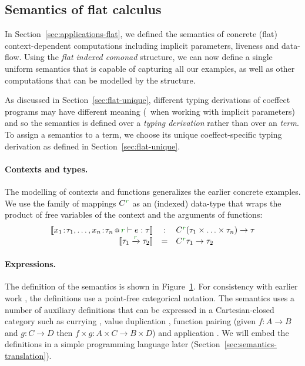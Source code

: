 \begin{figure*}[t]
\label{fig:semantics-flat}
\end{figure*}


\subsection{Semantics of flat calculus}
\label{sec:semantics-flat-calculus}

In Section~\ref{sec:applications-flat}, we defined the semantics of concrete (flat) context-dependent
computations including implicit parameters, liveness and data-flow. Using the \emph{flat indexed 
comonad} structure, we can now define a single uniform semantics that is capable of capturing all 
our examples, as well as other computations that can be modelled by the structure.

As discussed in Section~\ref{sec:flat-unique}, different typing derivations of coeffect programs 
may have different meaning (\eg~when working with implicit parameters) and so the semantics is
defined over a \emph{typing derivation} rather than over an \emph{term}. To assign a 
semantics to a term, we choose its unique coeffect-specific typing derivation as defined in 
Section~\ref{sec:flat-unique}.

\paragraph{Contexts and types.}
The modelling of contexts and functions generalizes the earlier concrete examples. We use the 
family of mappings $\ctyp{\cclrd{r}}{}$ as an (indexed) data-type that wraps the product of 
free variables of the context and the arguments of functions:
%
\begin{equation*}
\begin{array}{rcl}
\sem{\coctx{x_1\!:\!\tau_1, \ldots, x_n\!:\!\tau_n}{ \cclrd{r} } \vdash e : \tau} 
  &:& \ctyp{\cclrd{r}}{(\tau_1 \times \ldots \times \tau_n)} \rightarrow \tau\\
\sem{\tau_1 \xrightarrow{\cclrd{r}} \tau_2} &=& \ctyp{\cclrd{r}}{\tau_1} \rightarrow \tau_2
\end{array}
\end{equation*}

\paragraph{Expressions.}
The definition of the semantics is shown in Figure~\ref{fig:semantics-flat}. For consistency
with earlier work \cite{comonads-notions,comonads-dom-thesis}, the definitions use a point-free 
categorical notation. The semantics uses a number of auxiliary definitions that can be expressed
in a Cartesian-closed category such as currying , value duplication ,
function pairing (given $f:A\rightarrow B$ and $g:C\rightarrow D$ then $f\times g : A\times C \rightarrow B \times D$)
and application . We will embed the definitions in a simple programming language 
later (Section~\ref{sec:semantics-translation}).

